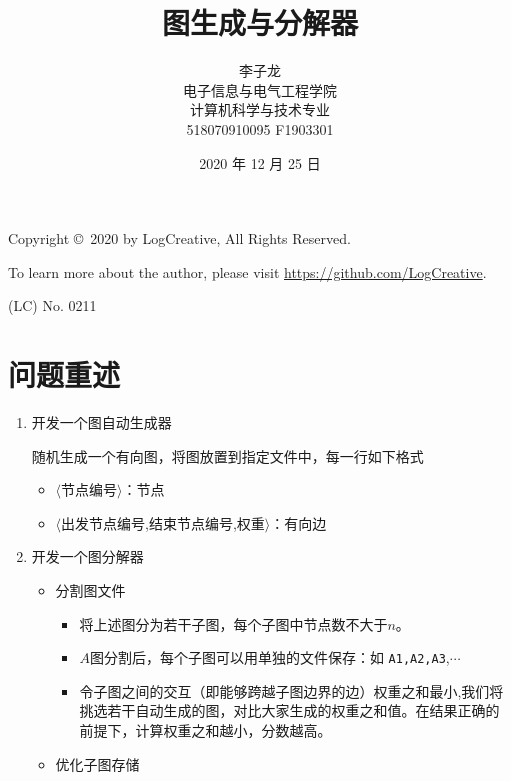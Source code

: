\documentclass[a4paper,12pt]{article}
\begin{document}
\begin{CJK}{UTF8}{song}
\title{图生成与分解器}
\author{李子龙\\\small 电子信息与电气工程学院\\\small 计算机科学与技术专业\\\small 518070910095 F1903301}
\date{2020 年 12 月 25 日}
\maketitle
\normalsize

\begin{tcolorbox}
    Copyright \copyright\ 2020 by LogCreative, All Rights Reserved.
    
    To learn more about the author, please visit \href{https://github.com/LogCreative}{https://github.com/LogCreative}.

    (LC) No. 0211
\end{tcolorbox}

\section{问题重述}

\begin{enumerate}
    \item 开发一个图自动生成器
    
    随机生成一个有向图，将图放置到指定文件中，每一行如下格式
    \begin{itemize}
        \item $\langle$节点编号$\rangle$：节点
        \item $\langle$出发节点编号,结束节点编号,权重$\rangle$：有向边
    \end{itemize}

    \item 开发一个图分解器
    \begin{itemize}
        \item 分割图文件
        \begin{itemize}
            \item 将上述图分为若干子图，每个子图中节点数不大于$n$。
            \item $A$图分割后，每个子图可以用单独的文件保存：如 \texttt{A1,A2,A3},$\cdots$
            \item 令子图之间的交互（即能够跨越子图边界的边）权重之和最小,我们将挑选若干自动生成的图，对比大家生成的权重之和值。在结果正确的前提下，计算权重之和越小，分数越高。
        \end{itemize}
        \item 优化子图存储
        

\end{itemize}
\end{enumerate}
\end{CJK}
\end{document}
